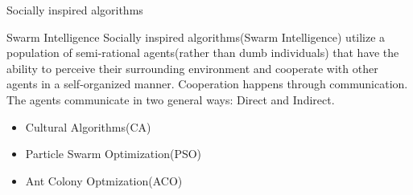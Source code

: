 \documentclass[table]{beamer}
\begin{document}
	
	\begin{frame}{Socially inspired algorithms}
		\begin{block}{Swarm Intelligence}
			\justifying
			\cite{kennedy2001swarm} Socially inspired algorithms(Swarm Intelligence) utilize a population of semi-rational agents(rather than dumb individuals) that have the ability to perceive their surrounding environment and cooperate with other agents in a \alert{self-organized} manner. \newline Cooperation happens through communication. The agents communicate in two general ways: Direct and Indirect.
		\end{block}
		\begin{block}{}
			\begin{itemize}
				\item Cultural Algorithms(CA) \cite{reynolds1994introduction}
				\item Particle Swarm Optimization(PSO) \cite{clerc2010particle}
				\item Ant Colony Optmization(ACO) \cite{dorigo2006ant}
			\end{itemize}
		\end{block}
	\end{frame}
	
\end{document}
